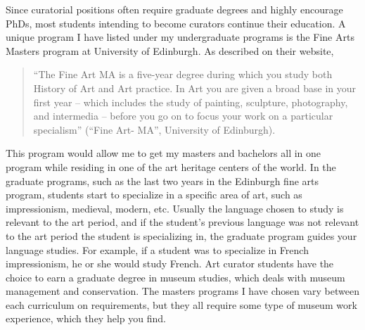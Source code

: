 \begin{multicols}{2}
	Since curatorial positions often require graduate degrees and highly encourage PhDs, most students intending to become curators continue their education. A unique program I have listed under my undergraduate programs is the Fine Arts Masters program at University of Edinburgh. As described on their website, 
	\begin{quote}
		“The Fine Art MA is a five-year degree during which you study both History of Art and Art practice. In Art you are given a broad base in your first year – which includes the study of painting, sculpture, photography, and intermedia – before you go on to focus your work on a particular specialism” (“Fine Art- MA”, University of Edinburgh). 
	\end{quote}
	This program would allow me to get my masters and bachelors all in one program while residing in one of the art heritage centers of the world. In the graduate programs, such as the last two years in the Edinburgh fine arts program, students start to specialize in a specific area of art, such as impressionism, medieval, modern, etc. Usually the language chosen to study is relevant to the art period, and if the student’s previous language was not relevant to the art period the student is specializing in, the graduate program guides your language studies. For example, if a student was to specialize in French impressionism, he or she would study French. Art curator students have the choice to earn a graduate degree in museum studies, which deals with museum management and conservation. The masters programs I have chosen vary between each curriculum on requirements, but they all require some type of museum work experience, which they help you find. 


\end{multicols}
